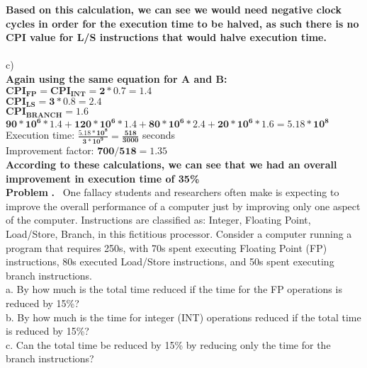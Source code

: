 \documentclass[11pt]{article}
\newcounter{problem}
\newcounter{solution}
\newcommand\Problem{%
	\stepcounter{problem}%
	\textbf{\theproblem.}~%
	\setcounter{solution}{0}%
}
\begin{document}
	\textbf{Based on this calculation, we can see we would need negative clock cycles in order for the execution time to be halved, as such there is no CPI value for L/S instructions that would halve execution time.}
	\\
	\\
	c)\\
	\textbf{Again using the same equation for A and B:}\\
	$\mathbf{CPI_{FP} = CPI_{INT} = 2*0.7 = 1.4}$\\
	$\mathbf{CPI_{LS} = 3*0.8 = 2.4}$\\
	$\mathbf{CPI_{BRANCH} = 1.6}$\\
	$\mathbf{90*10^6*1.4 + 120*10^6*1.4 + 80*10^6*2.4 + 20*10^6*1.6 = 5.18*10^8}$\\
	Execution time: $\mathbf{\frac{5.18*10^8}{3*10^9} = \frac{518}{3000}}$ seconds\\
	Improvement factor: $\mathbf{700/518} = 1.35$\\
	\textbf{According to these calculations, we can see that we had an overall improvement in execution time of 35\%}\\
	
	\textbf{Problem} \Problem One fallacy students and researchers often make is expecting to improve the overall performance of a computer
	just by improving only one aspect of the computer. Instructions are classified as: Integer, Floating Point,
	Load/Store, Branch, in this fictitious processor. Consider a computer running a program that requires 250s, with
	70s spent executing Floating Point (FP) instructions, 80s executed Load/Store instructions, and 50s spent
	executing branch instructions.\\
	a. By how much is the total time reduced if the time for the FP operations is reduced by 15\%?\\
	b. By how much is the time for integer (INT) operations reduced if the total time is reduced by 15\%?\\
	c. Can the total time be reduced by 15\% by reducing only the time for the branch instructions?\\
	
\end{document}
